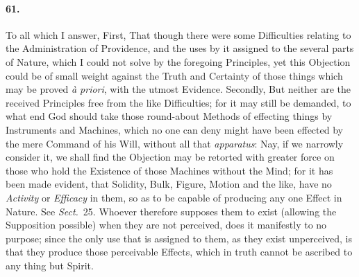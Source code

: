\documentclass[]{article}
\newenvironment{sectionbody}{}{}
\begin{document}
\begin{sectionbody}
\paragraph{61.} To all which I answer, First, That though there were some
Difficulties relating to the Administration of Providence, and
the uses by it assigned to the several parts of Nature, which I
could not solve by the foregoing Principles, yet this Objection
could be of small weight against the Truth and Certainty of those
things which may be proved \emph{\`{a} priori}, with the
utmost Evidence.  Secondly, But neither are the received
Principles free from the like Difficulties; for it may still be
demanded, to what end God should take those round-about Methods
of effecting things by Instruments and Machines, which no one can
deny might have been effected by the mere Command of his Will,
without all that \emph{apparatus}: Nay, if we narrowly consider
it, we shall find the Objection may be retorted with greater
force on those who hold the Existence of those Machines without
the Mind; for it has been made evident, that Solidity, Bulk,
Figure, Motion and the like, have no \emph{Activity} or
\emph{Efficacy} in them, so as to be capable of producing any
one Effect in Nature.  See \emph{Sect.}~25.
Whoever therefore supposes them to exist (allowing the
Supposition possible) when they are not perceived, does it
manifestly to no purpose; since the only use that is assigned to
them, as they exist unperceived, is that they produce those
perceivable Effects, which in truth cannot be ascribed to any
thing but Spirit.




\end{sectionbody}
\end{document}
